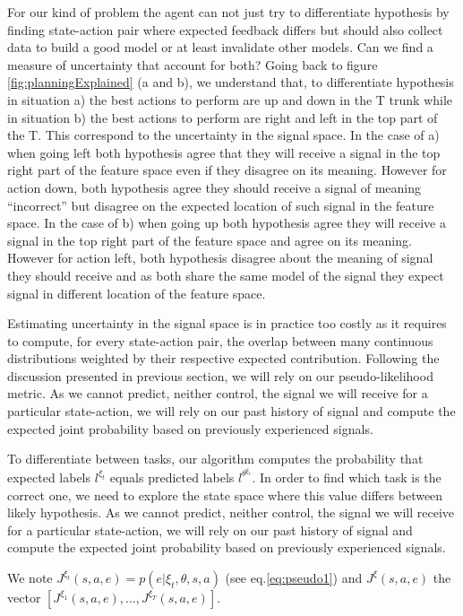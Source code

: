 For our kind of problem the agent can not just try to differentiate hypothesis by finding state-action pair where expected feedback differs but should also collect data to build a good model or at least invalidate other models. Can we find a measure of uncertainty that account for both? Going back to figure \ref{fig:planningExplained} (a and b), we understand that, to differentiate hypothesis in situation a) the best actions to perform are up and down in the T trunk while in situation b) the best actions to perform are right and left in the top part of the T. This correspond to the uncertainty in the signal space. In the case of a) when going left both hypothesis agree that they will receive a signal in the top right part of the feature space even if they disagree on its meaning. However for action down, both hypothesis agree they should receive a signal of meaning ``incorrect'' but disagree on the expected location of such signal in the feature space. In the case of b) when going up both hypothesis agree they will receive a signal in the top right part of the feature space and agree on its meaning. However for action left, both hypothesis disagree about the meaning of signal they should receive and as both share the same model of the signal they expect signal in different location of the feature space.

Estimating uncertainty in the signal space is in practice too costly as it requires to compute, for every state-action pair, the overlap between many continuous distributions weighted by their respective expected contribution. Following the discussion presented in previous section, we will rely on our pseudo-likelihood metric. As we cannot predict, neither control, the signal we will receive for a particular state-action, we will rely on our past history of signal and compute the expected joint probability based on previously experienced signals.

To differentiate between tasks, our algorithm computes the probability that expected labels $l^{\xi_t}$ equals predicted labels $l^{\theta^{\xi_t}}$. In order to find which task is the correct one, we need to explore the state space where this value differs between likely hypothesis. As we cannot predict, neither control, the signal we will receive for a particular state-action, we will rely on our past history of signal and compute the expected joint probability based on previously experienced signals.

We note $J^{\xi_t}(s,a,e) = p(e | \xi_t, \theta, s, a)$ (see eq.\ref{eq:pseudo1}) and $J^{\xi}(s,a,e)$ the vector $[J^{\xi_1}(s,a,e), \ldots, J^{\xi_T}(s,a,e)]$.

